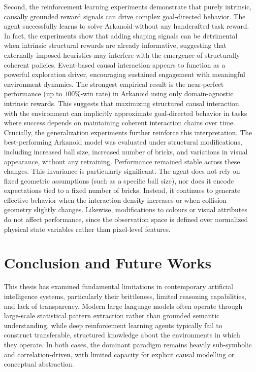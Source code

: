 \documentclass[12pt,a4paper]{report}
\begin{document}
Second, the reinforcement learning experiments demonstrate that purely intrinsic, causally grounded reward signals can drive complex goal-directed behavior. The agent successfully learns to solve Arkanoid without any handcrafted task reward. In fact, the experiments show that adding shaping signals can be detrimental when intrinsic structural rewards are already informative, suggesting that externally imposed heuristics may interfere with the emergence of structurally coherent policies. Event-based causal interaction appears to function as a powerful exploration driver, encouraging sustained engagement with meaningful environment dynamics.
The strongest empirical result is the near-perfect performance (up to $100$\%-win rate) in Arkanoid using only domain-agnostic intrinsic rewards. This suggests that maximizing structured causal interaction with the environment can implicitly approximate goal-directed behavior in tasks where success depends on maintaining coherent interaction chains over time.
Crucially, the generalization experiments further reinforce this interpretation. The best-performing Arkanoid model was evaluated under structural modifications, including increased ball size, increased number of bricks, and variations in visual appearance, without any retraining. Performance remained stable across these changes.
This invariance is particularly significant. The agent does not rely on fixed geometric assumptions (such as a specific ball size), nor does it encode expectations tied to a fixed number of bricks. Instead, it continues to generate effective behavior when the interaction density increases or when collision geometry slightly changes. Likewise, modifications to colours or visual attributes do not affect performance, since the observation space is defined over normalized physical state variables rather than pixel-level features.



\chapter{Conclusion and Future Works}
This thesis has examined fundamental limitations in contemporary artificial intelligence systems, particularly their brittleness, limited reasoning capabilities, and lack of transparency. Modern large language models often operate through large-scale statistical pattern extraction rather than grounded semantic understanding, while deep reinforcement learning agents typically fail to construct transferable, structured knowledge about the environments in which they operate. In both cases, the dominant paradigm remains heavily sub-symbolic and correlation-driven, with limited capacity for explicit causal modelling or conceptual abstraction.
\end{document}
